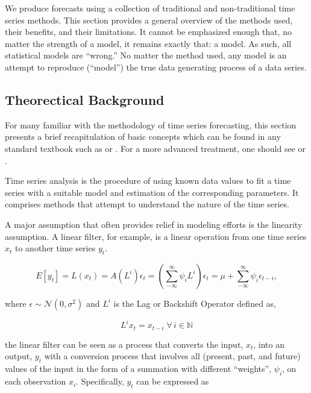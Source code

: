 \documentclass[
  11pt,
]{article}
\begin{document}
We produce forecasts using a collection of traditional and
non-traditional time series methods. This section provides a general
overview of the methods used, their benefits, and their limitations. It
cannot be emphasized enough that, no matter the strength of a model, it
remains exactly that: a model. As such, all statistical models are
``wrong.'' No matter the method used, any model is an attempt to
reproduce (``model'') the true data generating process of a data series.

\hypertarget{theorectical-background}{%
\subsection{Theorectical Background}\label{theorectical-background}}

For many familiar with the methodology of time series forecasting, this
section presents a brief recapitulation of basic concepts which can be
found in any standard textbook such as \cite{MJK} or \cite{brockwell02}.
For a more advanced treatment, one should see \cite{hamilton94} or
\cite{brockwell06}.

Time series analysis is the procedure of using known data values to fit
a time series with a suitable model and estimation of the corresponding
parameters. It comprises methods that attempt to understand the nature
of the time series.

A major assumption that often provides relief in modeling efforts is the
linearity assumption. A linear filter, for example, is a linear
operation from one time series \(x_{t}\) to another time series
\(y_{t}\).

\begin{equation}
E[y_{t}] = L(x_{t}) = A(L^{i})\epsilon_{t} = \left(\sum\limits_{-\infty}^{\infty} \psi_{i}L^{i}\right)\epsilon_{t} = \mu + \sum\limits_{-\infty}^{\infty}\psi_{i}\epsilon_{t-i},
\end{equation}

where \(\epsilon \sim \mathcal{N}(0, \sigma^{2})\) and \(L^{i}\) is the
Lag or Backshift Operator defined as,

\[
L^{i}x_{t} = x_{t-i} \; \forall \, i \in \mathbb{N}
\]

the linear filter can be seen as a process that converts the input,
\(x_{t}\), into an output, \(y_{t}\) with a conversion process that
involves all (present, past, and future) values of the input in the form
of a summation with different ``weights'', \(\psi_{i}\), on each
observation \(x_{i}\). Specifically, \(y_{t}\) can be expressed as
\end{document}

